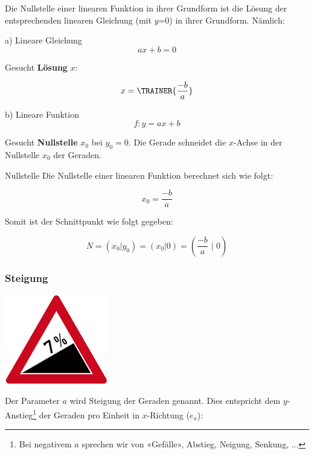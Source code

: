 Die Nullstelle einer linearen Funktion in ihrer Grundform ist die Lösung der entsprechenden linearen Gleichung (mit
$y$=0) in ihrer Grundform. Nämlich:

a) Lineare Gleichung $$ax+b=0$$

Gesucht \textbf{Lösung} $x$:

$$x = \TRAINER{\frac{-b}{a}}  $$

b) Lineare Funktion $$f: y=ax+b$$

Gesucht \textbf{Nullstelle} $x_0$ bei $y_0=0$. Die Gerade schneidet
die $x$-Achse in der Nullstelle $x_0$ der Geraden.

\begin{gesetz}{Nullstelle}{}
  Die Nullstelle einer linearen Funktion berechnet sich wie folgt:
  
$$x_0 = \frac{-b}{a}$$
\end{gesetz}

Somit ist der
Schnittpunkt wie folgt gegeben:

$$N = (x_0|y_0) = (x_0|0) =\left( \frac{-b}{a}\,\, \bigg|\,\, 0 \right) $$



\newpage


\subsubsection{Steigung}
  \includegraphics[width=4.5cm]{tals/trig1/img/starkeSteigung.jpg}

Der Parameter $a$ wird Steigung der Geraden genannt. Dies entspricht
dem $y$-Anstieg\footnote{Bei negativem $a$ sprechen wir von «Gefälle»,
  Abstieg, Neigung, Senkung, ...} der Geraden pro Einheit in $x$-Richtung ($e_x$):



